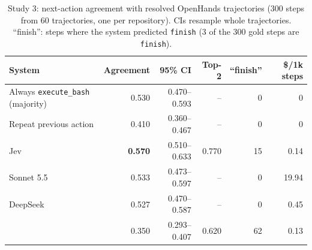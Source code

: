 \begin{table}[t]
\centering\small
\caption{Study 3: next-action agreement with resolved OpenHands trajectories (300 steps from 60 trajectories, one per repository). CIs resample whole trajectories. ``finish'': steps where the system predicted \texttt{finish} (3 of the 300 gold steps are \texttt{finish}).}
\label{tab:swe}
\begin{tabular}{@{}lrrrrr@{}}
\toprule
System & Agreement & 95\% CI & Top-2 & ``finish'' & \$/1k steps \\
\midrule
Always \texttt{execute\_bash} (majority) & 0.530 & 0.470--0.593 & -- & 0 & 0 \\
Repeat previous action & 0.410 & 0.360--0.467 & -- & 0 & 0 \\
Jev & \textbf{0.570} & 0.510--0.633 & 0.770 & 15 & 0.14 \\
Sonnet 5.5 & 0.533 & 0.473--0.597 & -- & 0 & 19.94 \\
DeepSeek & 0.527 & 0.470--0.587 & -- & 0 & 0.45 \\
\msd{} & 0.350 & 0.293--0.407 & 0.620 & 62 & 0.13 \\
\bottomrule
\end{tabular}
\end{table}



